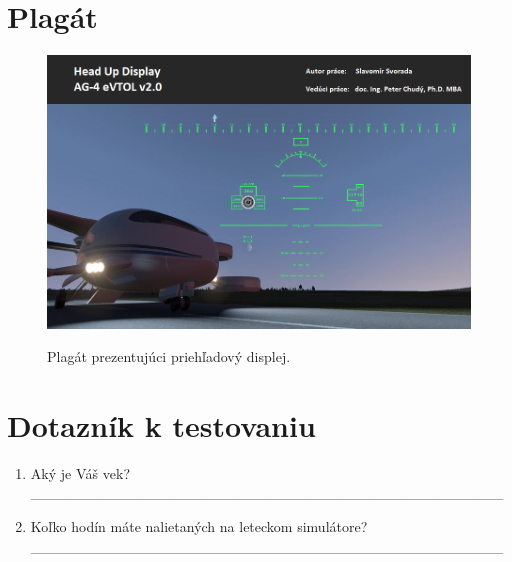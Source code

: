 
\chapter{Plagát}
\begin{figure}[ht]
\centering
\includegraphics[scale=0.6]{obrazky-figures/plagatFinal.png}
\caption{Plagát prezentujúci priehľadový displej.}{\label{plagat}}
\end{figure}

\chapter{Dotazník k testovaniu}

\noindent

\begin{enumerate}
\item{Aký je Váš vek? \newline
\_\_\_\_\_\_\_\_\_\_\_\_\_\_\_\_\_\_\_\_\_\_\_\_\_\_\_\_\_\_\_\_\_\_\_\_\_\_\_\_\_\_\_\_\_}

\item{Koľko hodín máte nalietaných na leteckom simulátore? \newline
\_\_\_\_\_\_\_\_\_\_\_\_\_\_\_\_\_\_\_\_\_\_\_\_\_\_\_\_\_\_\_\_\_\_\_\_\_\_\_\_\_\_\_\_\_}

\end{enumerate}


\newcommand{\printtblhdr}{%
  \hfill
  \begingroup
  \setlength\tabcolsep{0pt}%
  \begin{tabularx}{0.41\textwidth}{ @{} l *{3}X r @{} }
    \multicolumn{2}{l}{\bfseries\shortstack[l]{Zlá}}
    &&
    \multicolumn{2}{l}{\bfseries\shortstack[r]{Výborná}}
    \\
  \end{tabularx}
  \endgroup
}

